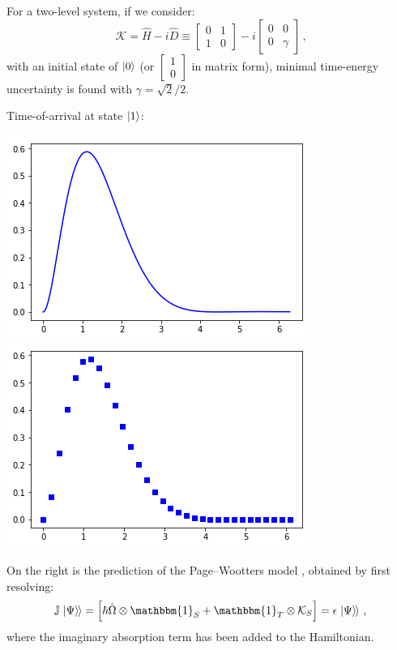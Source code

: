 \documentclass[a0,portrait]{a0poster}
\newcommand{\idop}{\mathbbm{1}}           %
\newcommand{\ox}{\otimes}
\DeclareMathOperator*{\repr}{\equiv}      %
\newcommand{\smallback}{\hspace{-0.115em}}
\newcommand{\dket}[1]{\left.\left| #1 \right\rangle\smallback\right\rangle}
\begin{document}
\begin{multicols}{2}
For a two-level system, if we consider:
\begin{equation}\label{eq:complexpot}
  \mathcal{K} = \hat{H} - i\hat{D} \repr
    \left[\begin{matrix}0 & 1\\1 & 0\end{matrix}\right] -
    i \left[\begin{matrix}0 & 0\\0 & \gamma \end{matrix}\right]
    \,\text{,}
\end{equation}
with an initial state of $\ket{0}$
(or $\left[\begin{matrix}1\\0\end{matrix}\right]$ in matrix form),
minimal time-energy uncertainty is found with $\gamma = \sqrt{2}/2$.

Time-of-arrival at state $\ket{1}$:
\begin{center}\vspace{1cm}
  \includegraphics[width=0.4\linewidth]{2ldetect/toa-cont.png}
  \includegraphics[width=0.4\linewidth]{2ldetect/toa-pw.png}
\end{center}\vspace{1cm}
On the right is the prediction of the Page--Wootters model \cite{Lloyd:Time},
obtained by first resolving:
\begin{equation}
  \mathbb{J} \dket{\Psi} = \left[ \hbar\hat{\Omega}\ox\idop_S + \idop_T\ox\mathcal{K}_S \right] = \epsilon\dket{\Psi} \,\text{,}
\end{equation}
where the imaginary absorption term has been added to the Hamiltonian.


\end{multicols}
\end{document}
